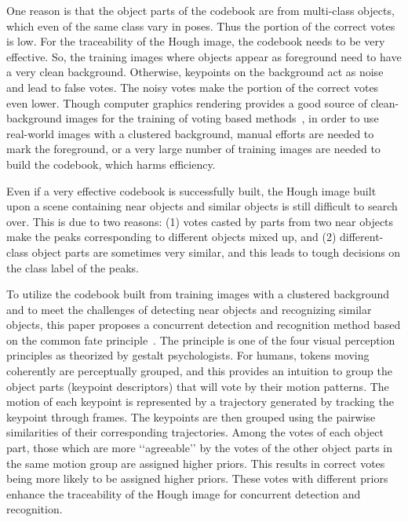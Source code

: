 \documentclass[10pt,twocolumn,letterpaper]{article}
\begin{document}
One reason is that the object parts of the codebook are from multi-class objects, which even of the same class vary in poses. Thus the portion of the correct votes is low. For the traceability of the Hough image, the codebook needs to be very effective. So, the training images where objects appear as foreground need to have a very clean background. Otherwise, keypoints on the background act as noise and lead to false votes. The noisy votes make the portion of the correct votes even lower. Though computer graphics rendering provides a good source of clean-background images for the training of voting based methods~\cite{ac19}, in order to use real-world images with a clustered background, manual efforts are needed to mark the foreground, or a very large number of training images are needed to build the codebook, which harms efficiency.

Even if a very effective codebook is successfully built, the Hough image built upon a scene containing near objects and similar objects is still difficult to search over. This is due to two reasons: (1) votes casted by parts from two near objects make the peaks corresponding to different objects mixed up, and (2) different-class object parts are sometimes very similar, and this leads to tough decisions on the class label of the peaks.


To utilize the codebook built from training images with a clustered background and to meet the challenges of detecting near objects and recognizing similar objects, this paper proposes a concurrent detection and recognition method based on the common fate principle~\cite{ac13}. The principle is one of the four visual perception principles as theorized by gestalt psychologists. For humans, tokens moving coherently are perceptually grouped, and this provides an intuition to group the object parts (keypoint descriptors) that will vote by their motion patterns. The motion of each keypoint is represented by a trajectory generated by tracking the keypoint through frames.
The keypoints are then grouped using the pairwise similarities of their corresponding trajectories. Among the votes of each object part, those which are more {\lq\lq}agreeable{\rq\rq} by the votes of the other object parts in the same motion group are assigned higher priors. This results in correct votes being more likely to be assigned higher priors. These votes with different priors enhance the traceability of the Hough image for concurrent detection and recognition.
\end{document}
